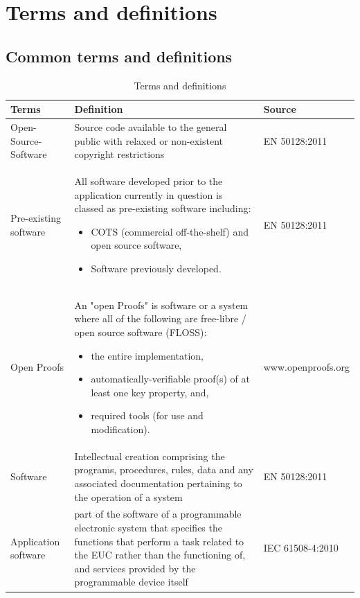 \documentclass{template/openetcs_report}
\begin{document}
\mainmatter

\chapter{Terms and definitions}
\section{Common terms and definitions}
\begin{table} [h]
\begin{tabular}{|p{4cm}|p{7cm}|p{3cm}|}
\hline
\bfseries Terms & \bfseries Definition & \bfseries Source \\ 
\hline 
\hline
Open-Source-Software & Source code available to the general public with relaxed or non-existent copyright restrictions & EN 50128:2011 \\ 
\hline
Pre-existing software & All software developed prior to the application currently in question is classed as pre-existing software including: 
\begin{itemize}
\item COTS (commercial off-the-shelf) and open source software,
\item Software previously developed.
\end{itemize} & EN 50128:2011 \\ 
\hline
Open Proofs & An "open Proofs" is software or a system where all of the following are free-libre / open source software (FLOSS): 
\begin{itemize}
\item the entire implementation,
\item automatically-verifiable proof(s) of at least one key property, and,
\item required tools (for use and modification).
\end{itemize} & www.openproofs.org \\ 
\hline
Software & Intellectual creation comprising the programs, procedures, rules, data and any associated documentation pertaining to the operation of a system & EN 50128:2011 \\ 
\hline
Application software & part of the software of a programmable electronic system that specifies the functions that perform a task related to the EUC rather than the functioning of, and services provided by the programmable device itself & IEC 61508-4:2010 \\ 
\hline
\end{tabular}
\\
\caption{Terms and definitions}
\end{table}
\end{document}
